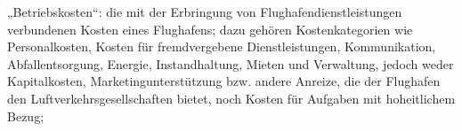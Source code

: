  
%
%
„Betriebskosten“: die mit der Erbringung von Flughafendienstleistungen verbundenen Kosten eines Flughafens;
 dazu gehören Kostenkategorien wie Personalkosten, Kosten für fremdvergebene Dienstleistungen, Kommunikation, 
 Abfallentsorgung, Energie, Instandhaltung, Mieten und Verwaltung, jedoch weder Kapitalkosten, Marketingunterstützung 
 bzw. andere Anreize, die der Flughafen den Luftverkehrsgesellschaften bietet, noch Kosten für Aufgaben mit hoheitlichem Bezug;

 	






